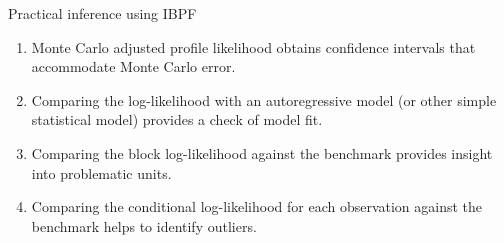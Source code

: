 \documentclass{beamer}
\begin{document}
\begin{frame}{Practical inference using IBPF}
  \begin{enumerate}
  \item Monte Carlo adjusted profile likelihood \citep{ionides17profile} obtains confidence intervals that accommodate Monte Carlo error.

  \item Comparing the log-likelihood with an autoregressive model (or other simple statistical model) provides a check of model fit.

  \item Comparing the block log-likelihood against the benchmark provides insight into problematic units.

    \item Comparing the conditional log-likelihood for each observation against the benchmark helps to identify outliers. 
    
  \end{enumerate}
  
  \end{frame}


  

\end{document}
